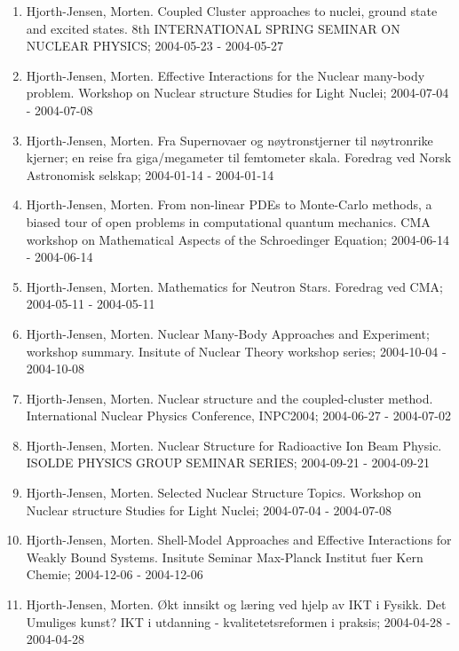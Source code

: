 \documentclass[%
oneside,                 %
final,                   %
10pt]{article}
\begin{document}
\begin{enumerate}
\item Hjorth-Jensen, Morten.  Coupled Cluster approaches to nuclei, ground state and excited states. 8th INTERNATIONAL SPRING SEMINAR ON NUCLEAR PHYSICS; 2004-05-23 - 2004-05-27

\item Hjorth-Jensen, Morten.  Effective Interactions for the Nuclear many-body problem. Workshop on Nuclear structure Studies for Light Nuclei; 2004-07-04 - 2004-07-08

\item Hjorth-Jensen, Morten. Fra Supernovaer og nøytronstjerner til nøytronrike kjerner; en reise fra giga/megameter til femtometer skala. Foredrag ved Norsk Astronomisk selskap; 2004-01-14 - 2004-01-14

\item Hjorth-Jensen, Morten. From non-linear PDEs to Monte-Carlo methods, a biased tour of open problems in computational quantum mechanics. CMA workshop on Mathematical Aspects of the Schroedinger Equation; 2004-06-14 - 2004-06-14

\item Hjorth-Jensen, Morten. Mathematics for Neutron Stars. Foredrag ved CMA; 2004-05-11 - 2004-05-11

\item Hjorth-Jensen, Morten. Nuclear Many-Body Approaches and Experiment; workshop summary. Insitute of Nuclear Theory workshop series; 2004-10-04 - 2004-10-08

\item Hjorth-Jensen, Morten.  Nuclear structure and the coupled-cluster method. International Nuclear Physics Conference, INPC2004; 2004-06-27 - 2004-07-02

\item Hjorth-Jensen, Morten.  Nuclear Structure for Radioactive Ion Beam Physic. ISOLDE PHYSICS GROUP SEMINAR SERIES; 2004-09-21 - 2004-09-21

\item Hjorth-Jensen, Morten.  Selected Nuclear Structure Topics. Workshop on Nuclear structure Studies for Light Nuclei; 2004-07-04 - 2004-07-08

\item Hjorth-Jensen, Morten.  Shell-Model Approaches and Effective Interactions for Weakly Bound Systems. Insitute Seminar Max-Planck Institut fuer Kern Chemie; 2004-12-06 - 2004-12-06

\item Hjorth-Jensen, Morten. Økt innsikt og læring ved hjelp av IKT i Fysikk. Det Umuliges kunst? IKT i utdanning - kvalitetetsreformen i praksis; 2004-04-28 - 2004-04-28


\end{enumerate}
\end{document}
